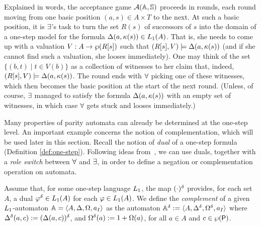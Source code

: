 Explained in words, the acceptance game $\mathcal{A}(\mathbb{A},\mathbb{S})$ proceeds in rounds, 
each round moving from one basic position $(a,s) \in A \times T$ to the next.
At such a basic position, it is $\exists$'s task to turn the set $R(s)$ of 
successors of $s$ into the domain of a one-step model for the formula 
$\Delta(a, \kappa(s)) \in L_{1}(A)$.
That is, she needs to come up with a valuation $V: A \to \wp(R[s])$ such that
$(R[s],V) \models \Delta (a, \kappa(s))$ (and if she cannot find such a 
valuation, she looses immediately).
One may think of the set $\{(b,t) \mid t \in V(b)\}$ as a collection of 
witnesses to her claim that, indeed, $(R[s],V) \models \Delta (a, \kappa(s))$.
The round ends with $\forall$ picking one of these witnesses, which then
becomes the basic position at the start of the next round.
(Unless, of course, $\exists$ managed to satisfy the formula $\Delta(a, 
\kappa(s))$ with an empty set of witnesses, in which case $\forall$ gets 
stuck and looses immediately.)

Many properties of parity automata can already be determined at the one-step
level.
An important example concerns the notion of complementation, which will be used
later in this section. Recall the notion of \emph{dual} of a one-step formula (Definition \ref{def:one-step}). Following ideas from~\cite{Muller1987,DBLP:conf/calco/KissigV09}, we can use duals, together with a \emph{role switch} between $\forall$ and
$\exists$, in order to define a negation or complementation operation on 
automata.




\begin{definition}
\label{d:caut}
Assume that, for some one-step language $L_{1}$, the map $(\cdot)^{\delta}$
provides, for each set $A$, a dual $\varphi^{\delta} \in L_{1}(A)$ for each
$\varphi \in L_{1}(A)$.
We define the \emph{complement} of a given $L_{1}$-automaton 
$\mathbb{A} = \langle{A,\Delta,\Omega,a_I}\rangle$ as the automaton $\mathbb{A}^{\delta} \mathrel{:=} 
\langle{A,\Delta^{\delta},\Omega^{\delta},a_I}\rangle$ where $\Delta^{\delta}(a,c) \mathrel{:=}
(\Delta(a,c))^{\delta}$, and $\Omega^{\delta}(a) \mathrel{:=} 1 + \Omega(a)$, for all 
$a \in A$ and $c \in \wp(\mathsf{P})$.
\end{definition}

